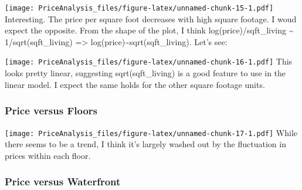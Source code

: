 \documentclass[]{article}
\newenvironment{Shaded}{\begin{snugshade}}{\end{snugshade}}
\newcommand{\KeywordTok}[1]{\textcolor[rgb]{0.13,0.29,0.53}{\textbf{#1}}}
\newcommand{\DataTypeTok}[1]{\textcolor[rgb]{0.13,0.29,0.53}{#1}}
\newcommand{\StringTok}[1]{\textcolor[rgb]{0.31,0.60,0.02}{#1}}
\newcommand{\OperatorTok}[1]{\textcolor[rgb]{0.81,0.36,0.00}{\textbf{#1}}}
\newcommand{\NormalTok}[1]{#1}
\begin{document}
\texttt{[image: PriceAnalysis\_files/figure-latex/unnamed-chunk-15-1.pdf]}
Interesting. The price per square foot decreases with high square
footage. I woud expect the opposite. From the shape of the plot, I think
log(price)/sqft\_living \textasciitilde{} 1/sqrt(sqft\_living)
=\textgreater{} log(price)\textasciitilde{}sqrt(sqft\_living). Let's
see:

\begin{Shaded}
\end{Shaded}

\texttt{[image: PriceAnalysis\_files/figure-latex/unnamed-chunk-16-1.pdf]}
This looks pretty linear, suggesting sqrt(sqft\_living) is a good
feature to use in the linear model. I expect the same holds for the
other square footage units.

\subsubsection{Price versus Floors}\label{price-versus-floors}

\begin{Shaded}
\end{Shaded}

\texttt{[image: PriceAnalysis\_files/figure-latex/unnamed-chunk-17-1.pdf]}
While there seems to be a trend, I think it's largely washed out by the
fluctuation in prices within each floor.

\subsubsection{Price versus Waterfront}\label{price-versus-waterfront}
\end{document}
